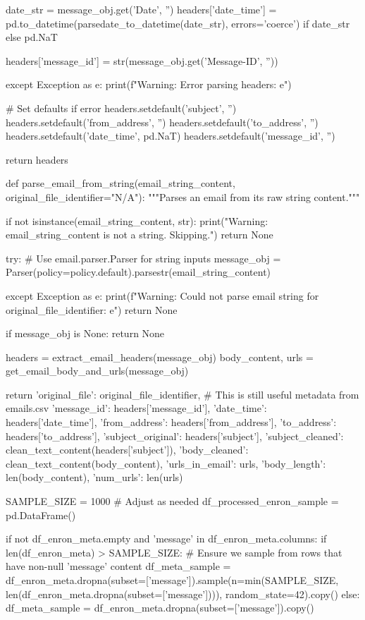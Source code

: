 \begin{ffcode}
        date_str = message_obj.get('Date', '')
        headers['date_time'] = pd.to_datetime(parsedate_to_datetime(date_str), errors='coerce') if date_str else pd.NaT

        headers['message_id'] = str(message_obj.get('Message-ID', ''))

    except Exception as e:
        print(f"Warning: Error parsing headers: {e}")

        # Set defaults if error
        headers.setdefault('subject', '')
        headers.setdefault('from_address', '')
        headers.setdefault('to_address', '')
        headers.setdefault('date_time', pd.NaT)
        headers.setdefault('message_id', '')

    return headers
     
def parse_email_from_string(email_string_content, original_file_identifier="N/A"):
    """Parses an email from its raw string content."""

    if not isinstance(email_string_content, str):
        print("Warning: email_string_content is not a string. Skipping.")
        return None

    try:
        # Use email.parser.Parser for string inputs
        message_obj = Parser(policy=policy.default).parsestr(email_string_content)

    except Exception as e:
        print(f"Warning: Could not parse email string for {original_file_identifier}: {e}")
        return None

    if message_obj is None:
        return None

    headers = extract_email_headers(message_obj)
    body_content, urls = get_email_body_and_urls(message_obj)

    return {
        'original_file': original_file_identifier, # This is still useful metadata from emails.csv
        'message_id': headers['message_id'],
        'date_time': headers['date_time'],
        'from_address': headers['from_address'],
        'to_address': headers['to_address'],
        'subject_original': headers['subject'],
        'subject_cleaned': clean_text_content(headers['subject']),
        'body_cleaned': clean_text_content(body_content),
        'urls_in_email': urls,
        'body_length': len(body_content),
        'num_urls': len(urls)
    }

    SAMPLE_SIZE = 1000 # Adjust as needed
    df_processed_enron_sample = pd.DataFrame()
    
    if not df_enron_meta.empty and 'message' in df_enron_meta.columns:
        if len(df_enron_meta) > SAMPLE_SIZE:
            # Ensure we sample from rows that have non-null 'message' content
            df_meta_sample = df_enron_meta.dropna(subset=['message']).sample(n=min(SAMPLE_SIZE, len(df_enron_meta.dropna(subset=['message']))), random_state=42).copy()
        else:
            df_meta_sample = df_enron_meta.dropna(subset=['message']).copy()
    

\end{ffcode}

